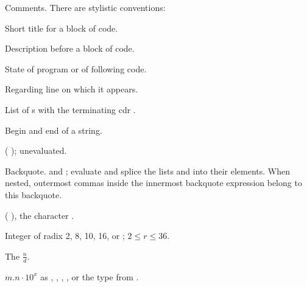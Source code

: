 \begin{LIST}{1cm}

  {
    Comments. There are stylistic conventions:
  }
  \begin{LIST}{.5cm}
    {Short title for a block of code.}
    
    {Description before a block of code.}
    
    {State of program or of following code.}
    
    {Regarding line on which it appears.}
    
  \end{LIST}
  
  {
    List of s with the terminating cdr .
  }
  
  {
    Begin and end of a string.
  }

  {
    ( );  unevaluated.
  }

  {
    Backquote.   and ; evaluate 
    and splice the lists  and  into their
    elements. When nested, outermost commas inside the innermost
    backquote expression belong to this backquote.
  }

  {
    ( ), the character .
  }

  {%
    Integer of radix 2, 8, 10, 16, or ; $2\le r \le 36$.
  }

  {
    The  $\frac{n}{d}$.
  }

  {
    $m.n\cdot10^x$ as , ,
    , , or the type from .
  }


\end{LIST}

